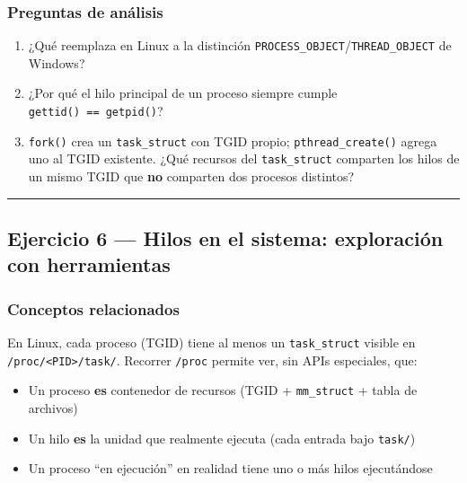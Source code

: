 \documentclass[
  spanish,
]{article}
\providecommand{\tightlist}{%
  \setlength{\itemsep}{0pt}\setlength{\parskip}{0pt}}
\begin{document}
\subsubsection{Preguntas de análisis}\label{preguntas-de-anuxe1lisis-4}

\begin{enumerate}
\def\labelenumi{\arabic{enumi}.}
\tightlist
\item
  ¿Qué reemplaza en Linux a la distinción
  \texttt{PROCESS\_OBJECT}/\texttt{THREAD\_OBJECT} de Windows?
\item
  ¿Por qué el hilo principal de un proceso siempre cumple
  \texttt{gettid()\ ==\ getpid()}?
\item
  \texttt{fork()} crea un \texttt{task\_struct} con TGID propio;
  \texttt{pthread\_create()} agrega uno al TGID existente. ¿Qué recursos
  del \texttt{task\_struct} comparten los hilos de un mismo TGID que
  \textbf{no} comparten dos procesos distintos?
\end{enumerate}

\begin{center}\rule{0.5\linewidth}{0.5pt}\end{center}

\subsection{Ejercicio 6 --- Hilos en el sistema: exploración con
herramientas}\label{ejercicio-6-hilos-en-el-sistema-exploraciuxf3n-con-herramientas}

\subsubsection{Conceptos relacionados}\label{conceptos-relacionados-5}

En Linux, cada proceso (TGID) tiene al menos un \texttt{task\_struct}
visible en \texttt{/proc/\textless{}PID\textgreater{}/task/}. Recorrer
\texttt{/proc} permite ver, sin APIs especiales, que:

\begin{itemize}
\tightlist
\item
  Un proceso \textbf{es} contenedor de recursos (TGID +
  \texttt{mm\_struct} + tabla de archivos)
\item
  Un hilo \textbf{es} la unidad que realmente ejecuta (cada entrada bajo
  \texttt{task/})
\item
  Un proceso ``en ejecución'' en realidad tiene uno o más hilos
  ejecutándose
\end{itemize}
\end{document}
